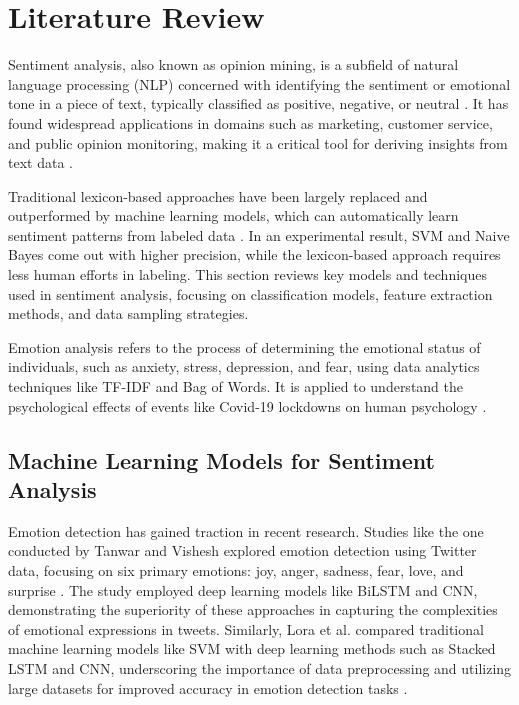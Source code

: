 

\section{Literature Review}

Sentiment analysis, also known as opinion mining, is a subfield of natural language processing (NLP) concerned with identifying the sentiment or emotional tone in a piece of text, typically classified as positive, negative, or neutral \cite{Saad2017}. It has found widespread applications in domains such as marketing, customer service, and public opinion monitoring, making it a critical tool for deriving insights from text data \cite{Rodriguez2023}.

Traditional lexicon-based approaches have been largely replaced and outperformed by machine learning models, which can automatically learn sentiment patterns from labeled data \cite{Mahmood2020}. In an experimental result, SVM and Naive Bayes come out with higher precision, while the lexicon-based approach requires less human efforts in labeling. This section reviews key models and techniques used in sentiment analysis, focusing on classification models, feature extraction methods, and data sampling strategies.

Emotion analysis refers to the process of determining the emotional status of individuals, such as anxiety, stress, depression, and fear, using data analytics techniques like TF-IDF and Bag of Words. It is applied to understand the psychological effects of events like Covid-19 lockdowns on human psychology \cite{Chatterjee2023}.

\subsection{Machine Learning Models for Sentiment Analysis}

Emotion detection has gained traction in recent research. Studies like the one conducted by Tanwar and Vishesh explored emotion detection using Twitter data, focusing on six primary emotions: joy, anger, sadness, fear, love, and surprise \cite{Tanwar2024}. The study employed deep learning models like BiLSTM and CNN, demonstrating the superiority of these approaches in capturing the complexities of emotional expressions in tweets. Similarly, Lora et al. compared traditional machine learning models like SVM with deep learning methods such as Stacked LSTM and CNN, underscoring the importance of data preprocessing and utilizing large datasets for improved accuracy in emotion detection tasks \cite{Lora2020}.

